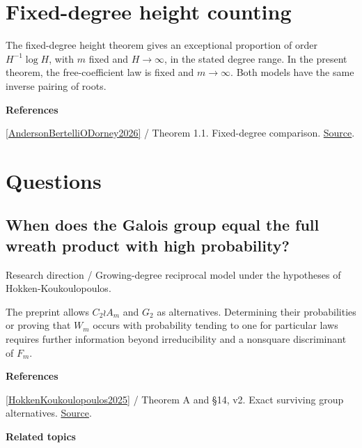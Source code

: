 \documentclass[11pt,a4paper,oneside,openany]{book}
\newenvironment{sources}{\par\smallskip\begingroup\footnotesize\color{atlasgray}\leftskip=10pt\setlength{\parskip}{2pt}}{\par\endgroup\smallskip}
\begin{document}
\section{Fixed-degree height counting}
\color{black} The fixed-degree height theorem gives an exceptional proportion of order \(H^{-1}\log H\), with \(m\) fixed and \(H\to\infty\), in the stated degree range. In the present theorem, the free-coefficient law is fixed and \(m\to\infty\). Both models have the same inverse pairing of roots.\par
\begin{sources}
\textbf{References}\par\smallskip
\noindent\hyperlink{ref:AndersonBertelliODorney2026}{[AndersonBertelliODorney2026]} / Theorem 1.1. Fixed-degree comparison. \href{https://arxiv.org/abs/2406.18970v2}{Source}.\par
\end{sources}\color{black}
\section*{Questions}
\subsection*{When does the Galois group equal the full wreath product with high probability?}
{\small\sffamily\color{atlasgold}Research direction / Growing-degree reciprocal model under the hypotheses of Hokken-Koukoulopoulos.}\par\smallskip
\color{black} The preprint allows \(C_2\wr A_m\) and \(G_2\) as alternatives. Determining their probabilities or proving that \(W_m\) occurs with probability tending to one for particular laws requires further information beyond irreducibility and a nonsquare discriminant of \(F_m\).\par
\begin{sources}
\textbf{References}\par\smallskip
\noindent\hyperlink{ref:HokkenKoukoulopoulos2025}{[HokkenKoukoulopoulos2025]} / Theorem A and §14, v2. Exact surviving group alternatives. \href{https://arxiv.org/abs/2510.18857v2}{Source}.\par
\end{sources}\color{black}
\par\medskip\begingroup\footnotesize\setlength{\parskip}{1pt}\textbf{\sffamily\color{atlasgreen}Related topics}\par
\end{document}

